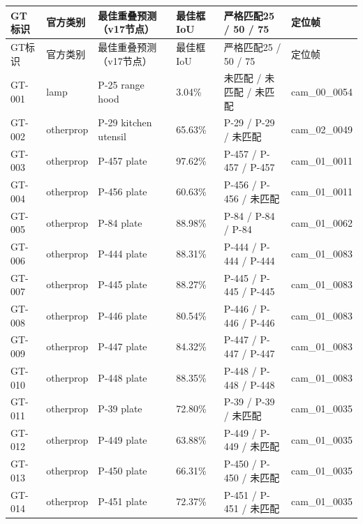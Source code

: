 \documentclass[UTF8,fontset=fandol]{ctexart}
\begin{document}
{\small
\begin{longtable}{|p{}|p{}|p{}|p{}|p{}|p{}|}
\hline
GT标识 & 官方类别 & 最佳重叠预测（v17节点） & 最佳框IoU & 严格匹配25 / 50 / 75 & 定位帧 \\ \hline
\endfirsthead
\hline
GT标识 & 官方类别 & 最佳重叠预测（v17节点） & 最佳框IoU & 严格匹配25 / 50 / 75 & 定位帧 \\ \hline
\endhead
GT-001 & lamp & P-25 range hood & 3.04\% & 未匹配 / 未匹配 / 未匹配 & cam\_00\_0054 \\ \hline
GT-002 & otherprop & P-29 kitchen utensil & 65.63\% & P-29 / P-29 / 未匹配 & cam\_02\_0049 \\ \hline
GT-003 & otherprop & P-457 plate & 97.62\% & P-457 / P-457 / P-457 & cam\_01\_0011 \\ \hline
GT-004 & otherprop & P-456 plate & 60.63\% & P-456 / P-456 / 未匹配 & cam\_01\_0011 \\ \hline
GT-005 & otherprop & P-84 plate & 88.98\% & P-84 / P-84 / P-84 & cam\_01\_0062 \\ \hline
GT-006 & otherprop & P-444 plate & 88.31\% & P-444 / P-444 / P-444 & cam\_01\_0083 \\ \hline
GT-007 & otherprop & P-445 plate & 88.27\% & P-445 / P-445 / P-445 & cam\_01\_0083 \\ \hline
GT-008 & otherprop & P-446 plate & 80.54\% & P-446 / P-446 / P-446 & cam\_01\_0083 \\ \hline
GT-009 & otherprop & P-447 plate & 84.32\% & P-447 / P-447 / P-447 & cam\_01\_0083 \\ \hline
GT-010 & otherprop & P-448 plate & 88.35\% & P-448 / P-448 / P-448 & cam\_01\_0083 \\ \hline
GT-011 & otherprop & P-39 plate & 72.80\% & P-39 / P-39 / 未匹配 & cam\_01\_0035 \\ \hline
GT-012 & otherprop & P-449 plate & 63.88\% & P-449 / P-449 / 未匹配 & cam\_01\_0035 \\ \hline
GT-013 & otherprop & P-450 plate & 66.31\% & P-450 / P-450 / 未匹配 & cam\_01\_0035 \\ \hline
GT-014 & otherprop & P-451 plate & 72.37\% & P-451 / P-451 / 未匹配 & cam\_01\_0035 \\ \hline

\end{longtable}}
\end{document}
